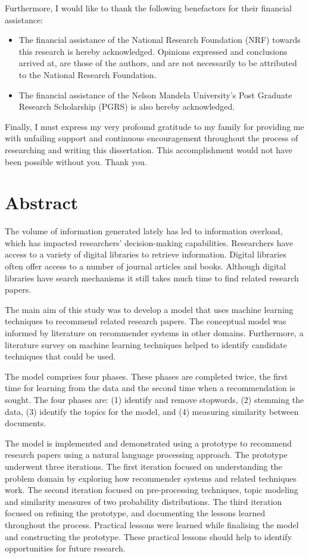 Furthermore, I would like to thank the following benefactors for their financial assistance:

\begin{itemize}
	\item The financial assistance of the National Research Foundation (NRF) towards this research is hereby acknowledged. Opinions expressed and conclusions arrived at, are those of the authors, and are not necessarily to be attributed to the National Research Foundation.
	\item The financial assistance of the Nelson Mandela University's Post Graduate Research Scholarship (PGRS) is also hereby acknowledged.
\end{itemize}

Finally, I must express my very profound gratitude to my family for providing me with unfailing support and continuous encouragement throughout the process of researching and writing this dissertation. This accomplishment would not have been possible without you. Thank you.

\chapter{Abstract}
The volume of information generated lately has led to information overload, which has impacted researchers’ decision-making capabilities. Researchers have access to a variety of digital libraries to retrieve information. Digital libraries often offer access to a number of journal articles and books. Although digital libraries have search mechanisms it still takes much time to find related research papers.

The main aim of this study was to develop a model that uses machine learning techniques to recommend related research papers. The conceptual model was informed by literature on recommender systems in other domains. Furthermore, a literature survey on machine learning techniques helped to identify candidate techniques that could be used.

The model comprises four phases. These phases are completed twice, the first time for learning from the data and the second time when a recommendation is sought. The four phases are: (1) identify and remove stopwords, (2) stemming the data, (3) identify the topics for the model, and (4) measuring similarity between documents.

The model is implemented and demonstrated using a prototype to recommend research papers using a natural language processing approach. The prototype underwent three iterations. The first iteration focused on understanding the problem domain by exploring how recommender systems and related techniques work. The second iteration focused on pre-processing techniques, topic modeling and similarity measures of two probability distributions. The third iteration focused on refining the prototype, and documenting the lessons learned throughout the process. Practical lessons were learned while finalising the model and constructing the prototype. These practical lessons should help to identify opportunities for future research.
